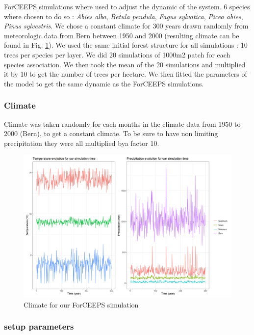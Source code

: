 \documentclass{article}
\begin{document}
ForCEEPS simulations where used to adjust the dynamic of the system. 6 species where chosen to do so : \textit{Abies alba}, \textit{Betula pendula}, \textit{Fagus sylvatica}, \textit{Picea abies}, \textit{Pinus sylvestris}. We chose a constant climate for 300 years drawn randomly from meteorologic data from Bern between 1950 and 2000 (resulting climate can be found in Fig. \ref{fig:climate}). We used the same initial forest structure for all simulations : 10 trees per species per layer. We did 20 simulations of 1000m2 patch for each species association. We then took the mean of the 20 simulations and multiplied it by 10 to get the number of trees per hectare. We then fitted the parameters of the model to get the same dynamic as the ForCEEPS simulations.

\subsubsection{Climate}

Climate was taken randomly for each months in the climate data from 1950 to 2000 (Bern), to get a constant climate. To be sure to have non limiting precipitation they were all multiplied bya factor 10.

\begin{figure}[H]
    \centering
    \includegraphics[width=1\textwidth]{Figure/Climate_simul.png}
    \caption{Climate for our ForCEEPS simulation}
    \label{fig:climate}
\end{figure}

\subsubsection{setup parameters}
\end{document}
